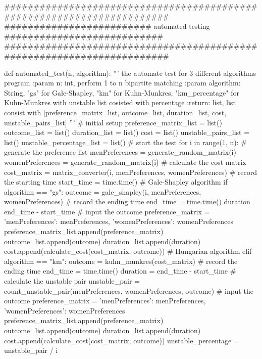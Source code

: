 \documentclass[14pt]{extarticle}
\begin{document}
\begin{python}
#######################################################################
######################### automated testing ###########################
#######################################################################

def automated_test(n, algorithm):
    '''
    the automate test for 3 different algorithms program
    :param n: int, perform 1 to n bipartite matching
    :param algorithm: String, "gs" for Gale-Shapley, "km" for Kuhn-Munkres, "km_percentage" for Kuhn-Munkres with unstable list cosisted with percentage
    :return: list, list consist with [preference_matrix_list, outcome_list, duration_list, cost, unstable_pairs_list]
    '''
    # initial setup
    preference_matrix_list = list()
    outcome_list = list()
    duration_list = list()
    cost = list()
    unstable_pairs_list = list()
    unstable_percentage_list = list()
    # start the test
    for i in range(1, n):        
        # generate the preference list
        menPreferences = generate_random_matrix(i)
        womenPreferences = generate_random_matrix(i)
        # calculate the cost matrix
        cost_matrix = matrix_converter(i, menPreferences, womenPreferences)
        # record the starting time        
        start_time = time.time()
        # Gale-Shapley algorithm    
        if algorithm == "gs":
            outcome = gale_shapley(i, menPreferences, womenPreferences)
            # record the ending time
            end_time = time.time()
            duration = end_time - start_time
            # input the outcome
            preference_matrix = {'menPreferences': menPreferences, 'womenPreferences': womenPreferences}
            preference_matrix_list.append(preference_matrix)
            outcome_list.append(outcome)
            duration_list.append(duration)
            cost.append(calculate_cost(cost_matrix, outcome))
        # Hungarian algorithm    
        elif algorithm == "km":
            outcome = kuhn_munkres(cost_matrix)
            # record the ending time
            end_time = time.time()
            duration = end_time - start_time
            # calculate the unstable pair
            unstable_pair = count_unstable_pair(menPreferences, womenPreferences, outcome)
            # input the outcome
            preference_matrix = {'menPreferences': menPreferences, 'womenPreferences': womenPreferences}
            preference_matrix_list.append(preference_matrix)
            outcome_list.append(outcome)
            duration_list.append(duration)
            cost.append(calculate_cost(cost_matrix, outcome))
            unstable_percentage = unstable_pair / i

\end{python}
\end{document}
